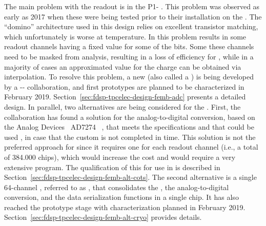 The main problem with the   readout is in the
P1- . This problem was observed as early as 2017 %
when these  were being tested prior to their installation
on the .%
The ``domino'' architecture used in this design relies on
excellent transistor matching, which %
unfortunately %
is worse at  temperature. In  this problem
results in some readout channels having a fixed value for some of
the  bits. Some these channels need to be masked 
from analysis, resulting in a loss of efficiency for , while
in a majority of cases an approximated value for the charge can
be obtained via interpolation. 
To resolve this problem, a new   (also called a 
 ) is being developed by a  
-- collaboration, and first
prototypes are planned to be characterized in February 2019. %
Section~\ref{sec:fdsp-tpcelec-design-femb-adc} presents a detailed design.  In parallel, two
alternatives are being considered for the . %
First, the  
collaboration has found %
a  
solution for the analog-to-digital conversion, based on the Analog 
Devices~\cite{AnalogDevices} AD7274~\cite{AD7274} , that meets 
the  specifications %
and that could be used , in %
case that the custom  is not %
completed in time. %
This 
solution is not the preferred approach for  since it
requires one  for each readout channel (i.e., a total
of \num{384,000} chips), which would increase the cost %
and would require a very extensive  program. The qualification
of this   for use in  is described
in Section~\ref{sec:fdsp-tpcelec-design-femb-alt-cots}. 
The second alternative is a single \num{64}-channel , referred to as ,
that consolidates the , the analog-to-digital conversion, and the
data serialization functions %
in a single chip. %
It has also reached the prototype stage with  %
characterization planned in February 2019. %
Section~\ref{sec:fdsp-tpcelec-design-femb-alt-cryo} provides details.


